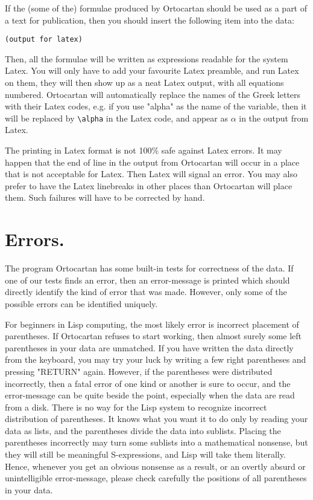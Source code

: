 If the (some of the) formulae produced by Ortocartan should be used as a part
of a text for publication, then you should insert the following item into the
data:

\bigskip

\begin{verbatim}
(output for latex)
\end{verbatim}

\bigskip

\noindent Then, all the formulae will be written as expressions readable for
the system Latex. You will only have to add your favourite Latex preamble, and
run Latex on them, they will then show up as a neat Latex output, with all
equations numbered. Ortocartan will automatically replace the names of the
Greek letters with their Latex codes, e.g. if you use "alpha" as the name of
the variable, then it will be replaced by \verb+\alpha+ in the Latex code, and
appear as $\alpha$ in the output from Latex.

The printing in Latex format is not 100\% safe against Latex errors. It may
happen that the end of line in the output from Ortocartan will occur in a place
that is not acceptable for Latex. Then Latex will signal an error. You may also
prefer to have the Latex linebreaks in other places than Ortocartan will place
them. Such failures will have to be corrected by hand.

\section{Errors.}
The program Ortocartan has some built-in tests for correctness of the data. If
one of our tests  finds  an  error, then an error-message is printed which
should directly identify the kind of error that was made. However, only some of
the possible errors can be identified uniquely.

For beginners in Lisp computing, the most likely  error
     is incorrect placement of parentheses. If Ortocartan refuses
     to start working, then almost surely some  left  parentheses
     in your data are unmatched. If you  have  written  the  data
     directly from the keyboard, you may try your luck by writing
     a  few  right  parentheses  and  pressing  "RETURN"   again.
     However, if the parentheses  were  distributed  incorrectly,
     then a fatal error of one kind or another is sure to  occur,
     and the  error-message  can  be  quite  beside the  point,
     especially when the data are read from a disk. There  is  no
     way for the Lisp system to recognize incorrect  distribution
of parentheses. It knows what you want  it  to  do  only  by
     reading your data as lists, and the parentheses  divide  the
     data into sublists. Placing the parentheses incorrectly  may
     turn some sublists into a mathematical  nonsense,  but  they
     will still be meaningful S-expressions, and Lisp  will  take
     them literally. Hence, whenever you get an obvious  nonsense
as a result, or an overtly absurd  or  unintelligible  error-message, please
check carefully the positions of all  parentheses in your data.

